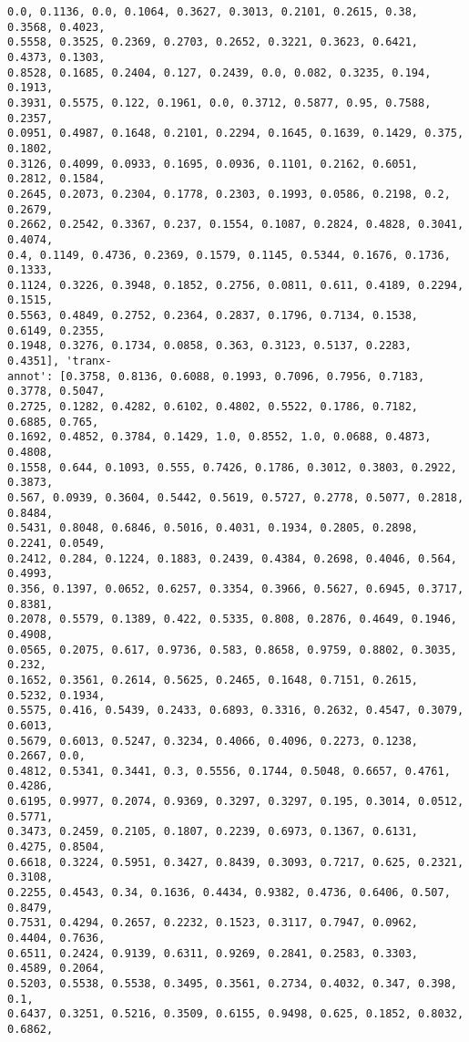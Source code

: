 \documentclass[11pt]{article}
\begin{document}
\begin{Verbatim}[commandchars=\\\{\}]
0.0, 0.1136, 0.0, 0.1064, 0.3627, 0.3013, 0.2101, 0.2615, 0.38, 0.3568, 0.4023,
0.5558, 0.3525, 0.2369, 0.2703, 0.2652, 0.3221, 0.3623, 0.6421, 0.4373, 0.1303,
0.8528, 0.1685, 0.2404, 0.127, 0.2439, 0.0, 0.082, 0.3235, 0.194, 0.1913,
0.3931, 0.5575, 0.122, 0.1961, 0.0, 0.3712, 0.5877, 0.95, 0.7588, 0.2357,
0.0951, 0.4987, 0.1648, 0.2101, 0.2294, 0.1645, 0.1639, 0.1429, 0.375, 0.1802,
0.3126, 0.4099, 0.0933, 0.1695, 0.0936, 0.1101, 0.2162, 0.6051, 0.2812, 0.1584,
0.2645, 0.2073, 0.2304, 0.1778, 0.2303, 0.1993, 0.0586, 0.2198, 0.2, 0.2679,
0.2662, 0.2542, 0.3367, 0.237, 0.1554, 0.1087, 0.2824, 0.4828, 0.3041, 0.4074,
0.4, 0.1149, 0.4736, 0.2369, 0.1579, 0.1145, 0.5344, 0.1676, 0.1736, 0.1333,
0.1124, 0.3226, 0.3948, 0.1852, 0.2756, 0.0811, 0.611, 0.4189, 0.2294, 0.1515,
0.5563, 0.4849, 0.2752, 0.2364, 0.2837, 0.1796, 0.7134, 0.1538, 0.6149, 0.2355,
0.1948, 0.3276, 0.1734, 0.0858, 0.363, 0.3123, 0.5137, 0.2283, 0.4351], 'tranx-
annot': [0.3758, 0.8136, 0.6088, 0.1993, 0.7096, 0.7956, 0.7183, 0.3778, 0.5047,
0.2725, 0.1282, 0.4282, 0.6102, 0.4802, 0.5522, 0.1786, 0.7182, 0.6885, 0.765,
0.1692, 0.4852, 0.3784, 0.1429, 1.0, 0.8552, 1.0, 0.0688, 0.4873, 0.4808,
0.1558, 0.644, 0.1093, 0.555, 0.7426, 0.1786, 0.3012, 0.3803, 0.2922, 0.3873,
0.567, 0.0939, 0.3604, 0.5442, 0.5619, 0.5727, 0.2778, 0.5077, 0.2818, 0.8484,
0.5431, 0.8048, 0.6846, 0.5016, 0.4031, 0.1934, 0.2805, 0.2898, 0.2241, 0.0549,
0.2412, 0.284, 0.1224, 0.1883, 0.2439, 0.4384, 0.2698, 0.4046, 0.564, 0.4993,
0.356, 0.1397, 0.0652, 0.6257, 0.3354, 0.3966, 0.5627, 0.6945, 0.3717, 0.8381,
0.2078, 0.5579, 0.1389, 0.422, 0.5335, 0.808, 0.2876, 0.4649, 0.1946, 0.4908,
0.0565, 0.2075, 0.617, 0.9736, 0.583, 0.8658, 0.9759, 0.8802, 0.3035, 0.232,
0.1652, 0.3561, 0.2614, 0.5625, 0.2465, 0.1648, 0.7151, 0.2615, 0.5232, 0.1934,
0.5575, 0.416, 0.5439, 0.2433, 0.6893, 0.3316, 0.2632, 0.4547, 0.3079, 0.6013,
0.5679, 0.6013, 0.5247, 0.3234, 0.4066, 0.4096, 0.2273, 0.1238, 0.2667, 0.0,
0.4812, 0.5341, 0.3441, 0.3, 0.5556, 0.1744, 0.5048, 0.6657, 0.4761, 0.4286,
0.6195, 0.9977, 0.2074, 0.9369, 0.3297, 0.3297, 0.195, 0.3014, 0.0512, 0.5771,
0.3473, 0.2459, 0.2105, 0.1807, 0.2239, 0.6973, 0.1367, 0.6131, 0.4275, 0.8504,
0.6618, 0.3224, 0.5951, 0.3427, 0.8439, 0.3093, 0.7217, 0.625, 0.2321, 0.3108,
0.2255, 0.4543, 0.34, 0.1636, 0.4434, 0.9382, 0.4736, 0.6406, 0.507, 0.8479,
0.7531, 0.4294, 0.2657, 0.2232, 0.1523, 0.3117, 0.7947, 0.0962, 0.4404, 0.7636,
0.6511, 0.2424, 0.9139, 0.6311, 0.9269, 0.2841, 0.2583, 0.3303, 0.4589, 0.2064,
0.5203, 0.5538, 0.5538, 0.3495, 0.3561, 0.2734, 0.4032, 0.347, 0.398, 0.1,
0.6437, 0.3251, 0.5216, 0.3509, 0.6155, 0.9498, 0.625, 0.1852, 0.8032, 0.6862,

\end{Verbatim}
\end{document}
